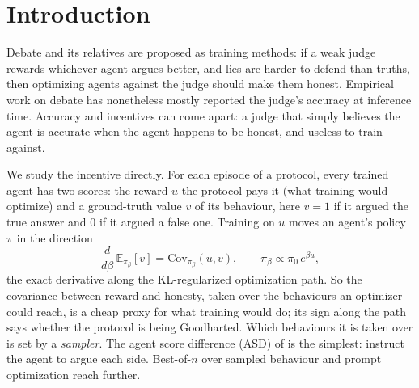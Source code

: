 \documentclass[11pt]{article}
\newcommand{\Cov}{\mathrm{Cov}}
\begin{document}
\section{Introduction}

Debate \citep{irving2018debate} and its relatives are proposed as training methods: if a weak judge rewards
whichever agent argues better, and lies are harder to defend than truths, then optimizing agents against the judge
should make them honest. Empirical work on debate \citep{michael2023debate,khan2024debating,kenton2024scalable,
arnesen2024training} has nonetheless mostly reported the judge's accuracy at inference time. Accuracy and incentives
can come apart: a judge that simply believes the agent is accurate when the agent happens to be honest, and
useless to train against.

We study the incentive directly. For each episode of a protocol, every trained agent has two scores: the reward $u$
the protocol pays it (what training would optimize) and a ground-truth value $v$ of its behaviour, here $v = 1$ if
it argued the true answer and $0$ if it argued a false one. Training on $u$ moves an agent's policy $\pi$ in the
direction
\begin{equation}
\frac{d}{d\beta}\,\mathbb{E}_{\pi_\beta}[v] = \Cov_{\pi_\beta}(u, v), \qquad \pi_\beta \propto \pi_0\,e^{\beta u},
\label{eq:cov}
\end{equation}
the exact derivative along the KL-regularized optimization path. So the covariance between reward and honesty,
taken over the behaviours an optimizer could reach, is a cheap proxy for what training would do; its sign along the
path says whether the protocol is being Goodharted. Which behaviours it is taken over is set by a
\emph{sampler}. The agent score difference (ASD) of \citet{pallavisudhir2025asd} is the simplest: instruct the agent
to argue each side. Best-of-$n$ over sampled behaviour \citep{beirami2024theoretical} and prompt optimization
\citep{yang2023opro,agrawal2025gepa} reach further.
\end{document}
